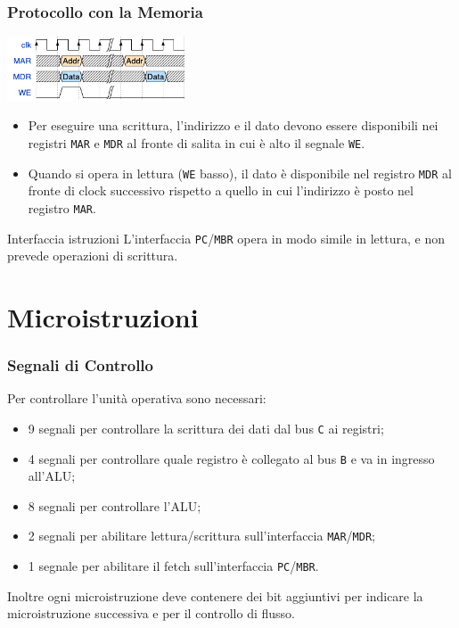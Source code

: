 \documentclass{beamer}
\begin{document}
\begin{frame}
  \frametitle{Protocollo con la Memoria}
  \begin{center}
    \includegraphics[width=0.4\textwidth]{mem_prot.png}
  \end{center}
  \begin{itemize}
    \item Per eseguire una scrittura, l'indirizzo e il dato devono essere
    disponibili nei registri \lstinline{MAR} e \lstinline{MDR} al fronte di
    salita in cui è alto il segnale \lstinline{WE}.
    \item Quando si opera in lettura (\lstinline{WE} basso), il dato è
    disponibile nel registro \lstinline{MDR} al fronte di clock successivo
    rispetto a quello in cui l'indirizzo è posto nel registro \lstinline{MAR}.
  \end{itemize}
  \begin{block}{Interfaccia istruzioni}
    L'interfaccia \lstinline{PC}/\lstinline{MBR} opera in modo simile in lettura,
    e non prevede operazioni di scrittura.
  \end{block}
\end{frame}

\section{Microistruzioni}
\begin{frame}
  \frametitle{Segnali di Controllo}
  Per controllare l'unità operativa sono necessari:
  \begin{itemize}
    \item 9 segnali per controllare la scrittura dei dati dal bus \lstinline{C}
    ai registri;
    \item 4 segnali per controllare quale registro è collegato al bus
    \lstinline{B} e va in ingresso all'ALU;
    \item 8 segnali per controllare l'ALU;
    \item 2 segnali per abilitare lettura/scrittura sull'interfaccia
    \lstinline{MAR}/\lstinline{MDR};
    \item 1 segnale per abilitare il fetch sull'interfaccia
    \lstinline{PC}/\lstinline{MBR}.
  \end{itemize}
  Inoltre ogni microistruzione deve contenere dei bit aggiuntivi per indicare la
  microistruzione successiva e per il controllo di flusso.
\end{frame}
\end{document}
